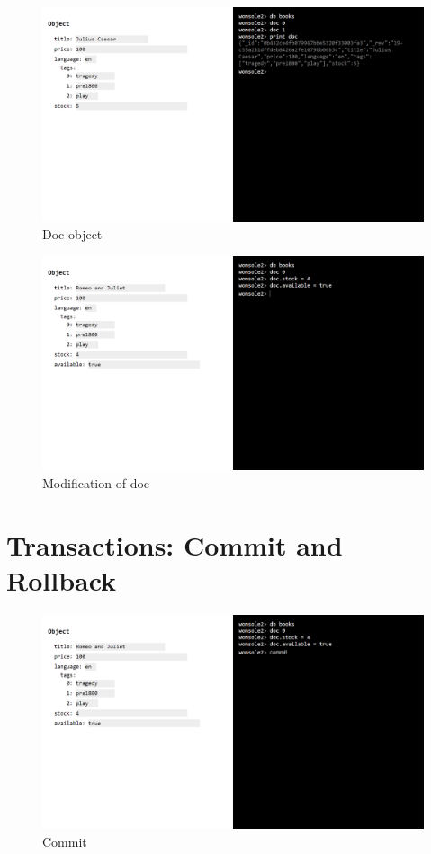 \documentclass[10pt,a4paper,oneside]{report}
\begin{document}
\begin{figure}
\centering
\includegraphics[width=\textwidth]{screenshot/wonsole2/wonsole2-32.png}
\caption{Doc object}
\label{wonsole2-32}
\end{figure}


\begin{figure}
\centering
\includegraphics[width=\textwidth]{screenshot/wonsole2/wonsole2-38.png}
\caption{Modification of doc}
\label{wonsole2-38}
\end{figure}



\section{Transactions: Commit and Rollback}
\begin{figure}
\centering
\includegraphics[width=\textwidth]{screenshot/wonsole2/wonsole2-39.png}
\caption{Commit}
\label{wonsole2-39}
\end{figure}
\end{document}
